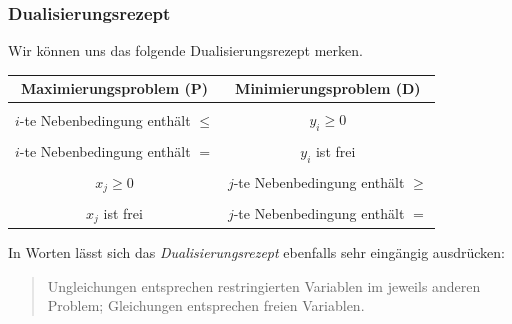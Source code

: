 \documentclass[smaller]{beamer}
\begin{document}
\begin{frame}
 \frametitle{Dualisierungsrezept}
 Wir können uns das folgende \alert{Dualisierungsrezept}\label{page:7:3} merken.

% 

\begin{center}\label{page:7:2}
\begin{tabular}{c|c}
{Maximierungsproblem (P)} & {Minimierungsproblem (D)} \\ [1ex] \hline\hline \\ [-1.5ex]
$i$-te Nebenbedingung enthält $\leq$ & $y_i \geq 0$ \\ [1ex] \hline \\ [-1.5ex]
$i$-te Nebenbedingung enthält $=$ & $y_i$ ist frei \\ [1ex] \hline \\ [-1.5ex]
$x_j \geq 0$ & $j$-te Nebenbedingung enthält $\geq$ \\ [1ex] \hline \\ [-1.5ex]
$x_j$ ist frei & $j$-te Nebenbedingung enthält $=$
\end{tabular}
\end{center}

In Worten lässt sich das \textit{Dualisierungsrezept} ebenfalls sehr eingängig ausdrücken:

\begin{quote}
\alert{Ungleichungen entsprechen restringierten Variablen im jeweils anderen Problem;
Gleichungen entsprechen freien Variablen.}
\end{quote}
\end{frame}
\end{document}
